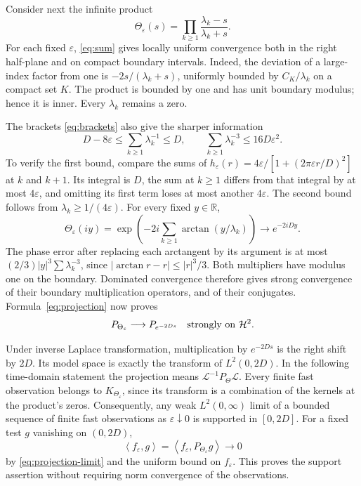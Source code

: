 \documentclass[11pt]{article}
\numberwithin{equation}{section}
\newcommand{\eps}{\varepsilon}
\newcommand{\HH}{\mathcal H^2}
\newcommand{\LL}{\mathcal L}
\newcommand{\ip}[2]{\left\langle #1,#2\right\rangle}
\begin{document}
Consider next the infinite product
\[
 \Theta_\eps(s)=\prod_{k\ge1}\frac{\lambda_k-s}{\lambda_k+s}.
\]
For each fixed $\eps$, \eqref{eq:sum} gives locally uniform convergence
both in the right half-plane and on compact boundary intervals.
Indeed, the deviation of a large-index factor from one is
$-2s/(\lambda_k+s)$, uniformly bounded by $C_K/\lambda_k$ on a
compact set $K$. The product is bounded by one and has unit boundary
modulus; hence it is inner. Every $\lambda_k$ remains a zero.

The brackets \eqref{eq:brackets} also give the sharper information
\begin{equation}\label{eq:sum-limit}
 D-8\eps\le\sum_{k\ge1}\lambda_k^{-1}\le D,\qquad
 \sum_{k\ge1}\lambda_k^{-3}\le16D\eps^2.
\end{equation}
To verify the first bound, compare the sums of
$h_\eps(r)=4\eps/[1+(2\pi\eps r/D)^2]$ at $k$ and $k+1$.
Its integral is $D$, the sum at $k\ge1$ differs from that integral
by at most $4\eps$, and omitting its first term loses at most another
$4\eps$. The second bound follows from $\lambda_k\ge1/(4\eps)$.
For every fixed $y\in\mathbb R$,
\begin{equation}\label{eq:Theta-limit}
 \Theta_\eps(iy)
 =\exp\!\left(-2i\sum_{k\ge1}\arctan(y/\lambda_k)\right)
 \longrightarrow e^{-2iDy}.
\end{equation}
The phase error after replacing each arctangent by its argument is
at most $(2/3)|y|^3\sum\lambda_k^{-3}$, since
$|\arctan r-r|\le|r|^3/3$.
Both multipliers have modulus one on the boundary.
Dominated convergence therefore gives strong convergence of their
boundary multiplication operators, and of their conjugates.
Formula~\eqref{eq:projection} now proves
\begin{equation}\label{eq:projection-limit}
 P_{\Theta_\eps}\longrightarrow P_{e^{-2Ds}}
       \quad\hbox{strongly on }\HH.
\end{equation}

Under inverse Laplace transformation, multiplication by $e^{-2Ds}$
is the right shift by $2D$. Its model space is exactly the transform
of $L^2(0,2D)$.
In the following time-domain statement the projection means
$\LL^{-1}P_\Theta\LL$.
Every finite fast observation belongs to $K_{\Theta_\eps}$,
since its transform is a combination of the kernels at the product's
zeros.
Consequently, any weak $L^2(0,\infty)$ limit of a bounded sequence of
finite fast observations as $\eps\downarrow0$ is supported in $[0,2D]$.
For a fixed test $g$ vanishing on $(0,2D)$,
\[
 \ip{f_\eps}g=\ip{f_\eps}{P_{\Theta_\eps}g}\longrightarrow0
\]
by \eqref{eq:projection-limit} and the uniform bound on $f_\eps$.
This proves the support assertion without requiring norm convergence
of the observations.
\end{document}
